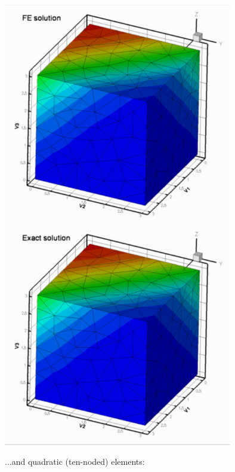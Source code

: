  
\begin{DoxyImage}
\includegraphics[width=0.75\textwidth]{compare_linear}
\end{DoxyImage}
 ...and quadratic (ten-\/noded) elements\+:

